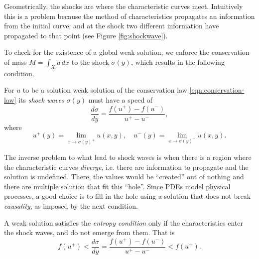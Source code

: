 Geometrically, the shocks are where the characteristic curves meet.
Intuitively this is a problem because the method of characteristics propagates
an information from the initial curve, and at the shock two different
information have propagated to that point (see Figure \ref{fig:shockwave}).

To check for the existence of a global weak solution, we enforce the
conservation of mass $M = \int_X u \,dx$ to the shock $\sigma(y)$, which
results in the following condition.

\begin{defn}
  For $u$ to be a solution weak solution of the conservation law
  \eqref{eqn:conservation-law} its \emph{shock waves} $\sigma(y)$ must have a
  speed of
  \[
    \frac{d\sigma}{dy} = \frac{f(u^+) - f(u^-)}{u^+ - u^-},
  \]
  where
  \[
    u^+(y) = \lim_{x \to\sigma(y)^+} u(x, y),
    \quad
    u^-(y) = \lim_{x \to\sigma(y)^-} u(x, y).
  \]
\end{defn}

The inverse problem to what lead to shock waves is when there is a region
where the characteristic curves \emph{diverge}, i.e. there are information to
propagate and the solution is undefined. There, the values would be
``created'' out of nothing and there are multiple solution that fit this
``hole''. Since PDEs model physical processes, a good choice is to fill in the
hole using a solution that does not break \emph{causality}, as imposed by the
next condition.

\begin{defn}
  A weak solution satisfies the \emph{entropy condition} only if the
  characteristics enter the shock waves, and do not emerge from them. That is
  \[
    f(u^+) <
    \frac{d\sigma}{dy} = \frac{f(u^+) - f(u^-)}{u^+ - u^-}
    < f(u^-).
  \]
\end{defn}

